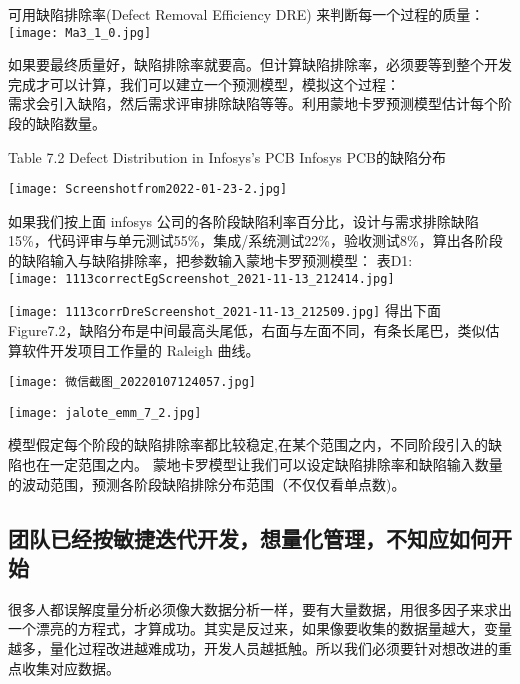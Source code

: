 可用缺陷排除率(Defect Removal Efficiency DRE) 来判断每一个过程的质量：\\

\texttt{[image: Ma3\_1\_0.jpg]}

如果要最终质量好，缺陷排除率就要高。但计算缺陷排除率，必须要等到整个开发完成才可以计算，我们可以建立一个预测模型，模拟这个过程：\\
需求会引入缺陷，然后需求评审排除缺陷等等。利用蒙地卡罗预测模型估计每个阶段的缺陷数量。

Table 7.2 Defect Distribution in Infosys's PCB Infosys PCB的缺陷分布

\texttt{[image: Screenshotfrom2022-01-23-2.jpg]}


如果我们按上面 infosys
公司的各阶段缺陷利率百分比，设计与需求排除缺陷15\%，代码评审与单元测试55\%，集成/系统测试22\%，验收测试8\%，算出各阶段的缺陷输入与缺陷排除率，把参数输入蒙地卡罗预测模型：
表D1:\\

\texttt{[image: 1113correctEgScreenshot\_2021-11-13\_212414.jpg]}

\texttt{[image: 1113corrDreScreenshot\_2021-11-13\_212509.jpg]}
得出下面Figure7.2，缺陷分布是中间最高头尾低，右面与左面不同，有条长尾巴，类似估算软件开发项目工作量的
Raleigh 曲线。

\texttt{[image: 微信截图\_20220107124057.jpg]}


\texttt{[image: jalote\_emm\_7\_2.jpg]}

模型假定每个阶段的缺陷排除率都比较稳定,在某个范围之内，不同阶段引入的缺陷也在一定范围之内。
蒙地卡罗模型让我们可以设定缺陷排除率和缺陷输入数量的波动范围，预测各阶段缺陷排除分布范围（不仅仅看单点数)。

\hypertarget{ux56e2ux961fux5df2ux7ecfux6309ux654fux6377ux8fedux4ee3ux5f00ux53d1ux60f3ux91cfux5316ux7ba1ux7406ux4e0dux77e5ux5e94ux5982ux4f55ux5f00ux59cb}{%
\subsection{团队已经按敏捷迭代开发，想量化管理，不知应如何开始}\label{ux56e2ux961fux5df2ux7ecfux6309ux654fux6377ux8fedux4ee3ux5f00ux53d1ux60f3ux91cfux5316ux7ba1ux7406ux4e0dux77e5ux5e94ux5982ux4f55ux5f00ux59cb}}

很多人都误解度量分析必须像大数据分析一样，要有大量数据，用很多因子来求出一个漂亮的方程式，才算成功。其实是反过来，如果像要收集的数据量越大，变量越多，量化过程改进越难成功，开发人员越抵触。所以我们必须要针对想改进的重点收集对应数据。


